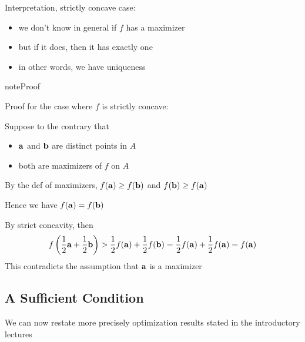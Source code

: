 \documentclass[letterpaper,10pt,english]{jupyterBook}
\begin{document}
\sphinxAtStartPar
Interpretation, strictly concave case:
\begin{itemize}
\item {} 
\sphinxAtStartPar
we don’t know in general if \(f\) has a maximizer

\item {} 
\sphinxAtStartPar
but if it does, then it has exactly one

\item {} 
\sphinxAtStartPar
in other words, we have uniqueness

\end{itemize}

\begin{sphinxadmonition}{note}{Proof}

\sphinxAtStartPar
Proof for the case where \(f\) is strictly concave:

\sphinxAtStartPar
Suppose to the contrary that
\begin{itemize}
\item {} 
\sphinxAtStartPar
\({\bf a}\) and \({\bf b}\) are distinct points in \(A\)

\item {} 
\sphinxAtStartPar
both are maximizers of \(f\) on \(A\)

\end{itemize}

\sphinxAtStartPar
By the def of maximizers, \(f({\bf a}) \geq f({\bf b})\) and \(f({\bf b}) \geq f({\bf a})\)

\sphinxAtStartPar
Hence we have \(f({\bf a}) = f({\bf b})\)

\sphinxAtStartPar
By strict concavity, then
\begin{equation*}
\begin{split}
%
f\left( \frac{1}{2} {\bf a} + \frac{1}{2} {\bf b} \right)
> \frac{1}{2} f( {\bf a}) + \frac{1}{2} f( {\bf b})
= \frac{1}{2} f( {\bf a}) + \frac{1}{2} f( {\bf a})
= f({\bf a})
%
\end{split}
\end{equation*}
\sphinxAtStartPar
This contradicts the assumption that \({\bf a}\) is a maximizer
\end{sphinxadmonition}


\subsection{A Sufficient Condition}
\label{\detokenize{06.optimization_fundamentals:a-sufficient-condition}}
\sphinxAtStartPar
We can now restate more precisely optimization results stated in the
introductory lectures
\end{document}
